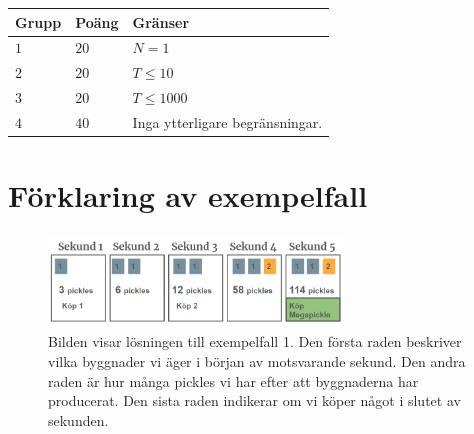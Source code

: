 \noindent
\begin{tabular}{| l | l | p{12cm} |}
  \hline
  \textbf{Grupp} & \textbf{Poäng} & \textbf{Gränser} \\ \hline
  $1$    & $20$       & $N=1$ \\ \hline
  $2$    & $20$       & $T \leq 10$ \\ \hline
  $3$    & $20$       & $T \leq 1000$ \\ \hline
  $4$    & $40$       & Inga ytterligare begränsningar. \\ \hline
\end{tabular}

\section*{Förklaring av exempelfall}

\begin{figure}[h]
  \centering
  \includegraphics[width=0.7\textwidth]{sample1.PNG}
    \\Bilden visar lösningen till exempelfall 1. Den första raden beskriver vilka byggnader
    vi äger i början av motsvarande sekund. Den andra raden är hur många pickles vi har 
    efter att byggnaderna har producerat. Den sista raden indikerar om vi köper något 
    i slutet av sekunden.
  
\end{figure}
